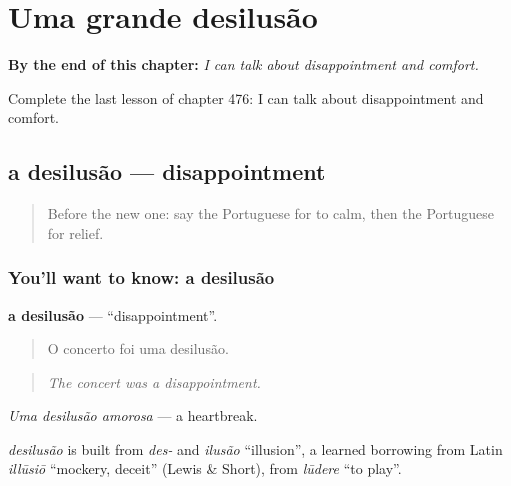 
\chapter{Uma grande desilusão}
\label{ch:pt-uma-grande-desilusao}

\begin{chapteropening}
\textbf{By the end of this chapter:} \emph{I can talk about disappointment and comfort.}

Complete the last lesson of chapter 476: I can talk about disappointment and comfort.
\end{chapteropening}

\section[a desilusão]{a desilusão — disappointment}

\label{lesson:PT-C476-desilusao}



\begin{quote}
Before the new one: say the Portuguese for to calm, then the Portuguese for relief.
\end{quote}

\subsection*{You'll want to know: a desilusão}
\textbf{a desilusão} — \textquotedblleft{}disappointment\textquotedblright{}.

\begin{quote}
O concerto foi uma desilusão.
\end{quote}

\begin{quote}
\emph{The concert was a disappointment.}
\end{quote}

\emph{Uma desilusão amorosa} — a heartbreak.

\begin{cousinweb}
\emph{desilusão} is built from \emph{des-} and \emph{ilusão} \textquotedblleft{}illusion\textquotedblright{}, a learned borrowing from Latin \emph{illūsiō} \textquotedblleft{}mockery, deceit\textquotedblright{} (Lewis \& Short), from \emph{lūdere} \textquotedblleft{}to play\textquotedblright{}.
\end{cousinweb}

